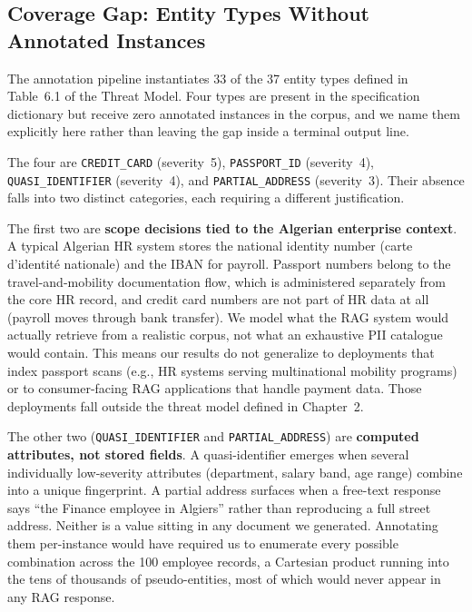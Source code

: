 \documentclass[12pt, a4paper]{article}
\begin{document}
\subsection{Coverage Gap: Entity Types Without Annotated Instances}
\label{subsec:coverage-gap}

The annotation pipeline instantiates 33 of the 37 entity types defined in Table~6.1 of the Threat Model. Four types are present in the specification dictionary but receive zero annotated instances in the corpus, and we name them explicitly here rather than leaving the gap inside a terminal output line.

The four are \texttt{CREDIT\_CARD} (severity~5), \texttt{PASSPORT\_ID} (severity~4), \texttt{QUASI\_IDENTIFIER} (severity~4), and \texttt{PARTIAL\_ADDRESS} (severity~3). Their absence falls into two distinct categories, each requiring a different justification.

The first two are \textbf{scope decisions tied to the Algerian enterprise context}. A typical Algerian HR system stores the national identity number (carte d'identité nationale) and the IBAN for payroll. Passport numbers belong to the travel-and-mobility documentation flow, which is administered separately from the core HR record, and credit card numbers are not part of HR data at all (payroll moves through bank transfer). We model what the RAG system would actually retrieve from a realistic corpus, not what an exhaustive PII catalogue would contain. This means our results do not generalize to deployments that index passport scans (e.g., HR systems serving multinational mobility programs) or to consumer-facing RAG applications that handle payment data. Those deployments fall outside the threat model defined in Chapter~2.

The other two (\texttt{QUASI\_IDENTIFIER} and \texttt{PARTIAL\_ADDRESS}) are \textbf{computed attributes, not stored fields}. A quasi-identifier emerges when several individually low-severity attributes (department, salary band, age range) combine into a unique fingerprint. A partial address surfaces when a free-text response says ``the Finance employee in Algiers'' rather than reproducing a full street address. Neither is a value sitting in any document we generated. Annotating them per-instance would have required us to enumerate every possible combination across the 100 employee records, a Cartesian product running into the tens of thousands of pseudo-entities, most of which would never appear in any RAG response.
\end{document}
